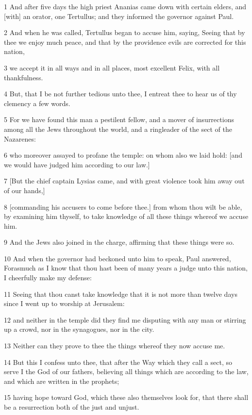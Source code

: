 \par 1 And after five days the high priest Ananias came down with certain elders, and [with] an orator, one Tertullus; and they informed the governor against Paul.
\par 2 And when he was called, Tertullus began to accuse him, saying, Seeing that by thee we enjoy much peace, and that by the providence evils are corrected for this nation,
\par 3 we accept it in all ways and in all places, most excellent Felix, with all thankfulness.
\par 4 But, that I be not further tedious unto thee, I entreat thee to hear us of thy clemency a few words.
\par 5 For we have found this man a pestilent fellow, and a mover of insurrections among all the Jews throughout the world, and a ringleader of the sect of the Nazarenes:
\par 6 who moreover assayed to profane the temple: on whom also we laid hold: [and we would have judged him according to our law.]
\par 7 [But the chief captain Lysias came, and with great violence took him away out of our hands,]
\par 8 [commanding his accusers to come before thee.] from whom thou wilt be able, by examining him thyself, to take knowledge of all these things whereof we accuse him.
\par 9 And the Jews also joined in the charge, affirming that these things were so.
\par 10 And when the governor had beckoned unto him to speak, Paul answered, Forasmuch as I know that thou hast been of many years a judge unto this nation, I cheerfully make my defense:
\par 11 Seeing that thou canst take knowledge that it is not more than twelve days since I went up to worship at Jerusalem:
\par 12 and neither in the temple did they find me disputing with any man or stirring up a crowd, nor in the synagogues, nor in the city.
\par 13 Neither can they prove to thee the things whereof they now accuse me.
\par 14 But this I confess unto thee, that after the Way which they call a sect, so serve I the God of our fathers, believing all things which are according to the law, and which are written in the prophets;
\par 15 having hope toward God, which these also themselves look for, that there shall be a resurrection both of the just and unjust.
